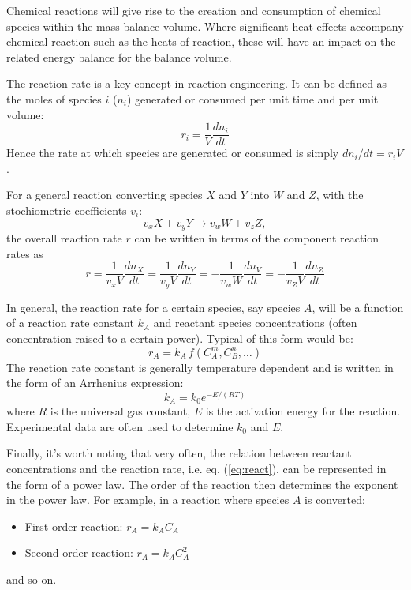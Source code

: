 \documentclass[a4paper,11pt]{article}
\theoremstyle{definition}
\begin{document}
Chemical reactions will give rise to the creation and consumption of chemical species
within the mass balance volume. Where significant heat effects accompany chemical
reaction such as the heats of reaction, these will have an impact on the related energy
balance for the balance volume.

The reaction rate is a key concept in reaction engineering. It can be defined as
the moles of species $i$ ($n_i$) generated or consumed per unit time and per unit
volume:
\begin{equation}
	r_i = \frac{1}{V} \frac{d n_i}{d t}
\end{equation}
\noindent Hence the rate at which species are generated or consumed is simply $d n_i / d t = r_i V$.

For a general reaction converting species $X$ and $Y$ into $W$ and $Z$, with the stochiometric coefficients $v_i$:
\begin{equation}
	v_x X + v_y Y \to v_w W + v_z Z,
\end{equation}
\noindent the overall reaction rate $r$ can be written in terms of the component reaction rates as
\begin{equation}
	r = \frac{1}{v_x V} \frac{d n_X}{d t} = \frac{1}{v_y V} \frac{d n_Y}{d t} 
		= - \frac{1}{v_w W} \frac{d n_V}{d t} = - \frac{1}{v_Z V} \frac{d n_Z}{d t}
\end{equation}

In general, the reaction rate for a certain species, say species $A$, will be a function of a reaction rate
constant $k_A$ and reactant species concentrations (often concentration raised to a certain power). Typical of this form would be:
\begin{equation} \label{eq:react}
	r_A = k_A \, f(C_A^m, C_B^n, \ldots)
\end{equation}
\noindent The reaction rate constant is generally temperature dependent and is written in
the form of an Arrhenius expression:
\begin{equation}
	k_A = k_0 e^{-E/(RT)}
\end{equation}
\noindent where $R$ is the universal gas constant, $E$ is the activation energy for the reaction.
Experimental data are often used to determine $k_0$ and $E$.

Finally, it's worth noting that very often, the relation between reactant concentrations and the reaction rate, i.e. eq. (\ref{eq:react}),
can be represented in the form of a power law. The order of the reaction then determines the exponent in the power law.
For example, in a reaction where species $A$ is converted:
\begin{itemize}
	\item First order reaction: $r_A = k_A C_A$
	\item Second order reaction: $r_A = k_A C_A^2$
\end{itemize}
\noindent and so on.
\end{document}
